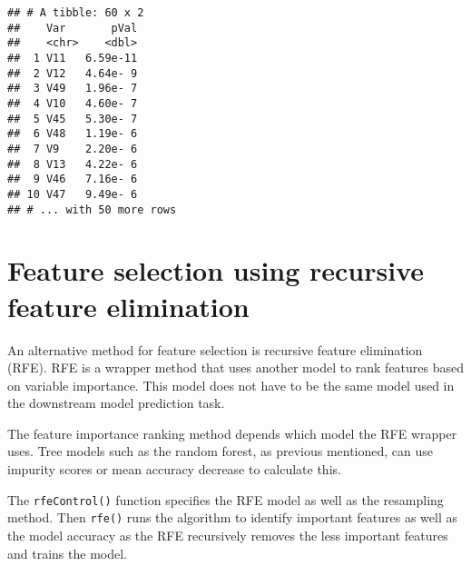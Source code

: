 \documentclass[
]{book}
\newenvironment{Shaded}{\begin{snugshade}}{\end{snugshade}}
\newcommand{\AttributeTok}[1]{\textcolor[rgb]{0.77,0.63,0.00}{#1}}
\newcommand{\DecValTok}[1]{\textcolor[rgb]{0.00,0.00,0.81}{#1}}
\newcommand{\FunctionTok}[1]{\textcolor[rgb]{0.00,0.00,0.00}{#1}}
\newcommand{\NormalTok}[1]{#1}
\newcommand{\OtherTok}[1]{\textcolor[rgb]{0.56,0.35,0.01}{#1}}
\newcommand{\SpecialCharTok}[1]{\textcolor[rgb]{0.00,0.00,0.00}{#1}}
\newcommand{\StringTok}[1]{\textcolor[rgb]{0.31,0.60,0.02}{#1}}
\begin{document}
\begin{verbatim}
## # A tibble: 60 x 2
##    Var       pVal
##    <chr>    <dbl>
##  1 V11   6.59e-11
##  2 V12   4.64e- 9
##  3 V49   1.96e- 7
##  4 V10   4.60e- 7
##  5 V45   5.30e- 7
##  6 V48   1.19e- 6
##  7 V9    2.20e- 6
##  8 V13   4.22e- 6
##  9 V46   7.16e- 6
## 10 V47   9.49e- 6
## # ... with 50 more rows
\end{verbatim}

\hypertarget{feature-selection-using-recursive-feature-elimination}{%
\section{Feature selection using recursive feature elimination}\label{feature-selection-using-recursive-feature-elimination}}

An alternative method for feature selection is recursive feature elimination (RFE). RFE is a wrapper method that uses another model to rank features based on variable importance. This model does not have to be the same model used in the downstream model prediction task.

The feature importance ranking method depends which model the RFE wrapper uses. Tree models such as the random forest, as previous mentioned, can use impurity scores or mean accuracy decrease to calculate this.

The \texttt{rfeControl()} function specifies the RFE model as well as the resampling method. Then \texttt{rfe()} runs the algorithm to identify important features as well as the model accuracy as the RFE recursively removes the less important features and trains the model.

\begin{Shaded}
\end{Shaded}
\end{document}
